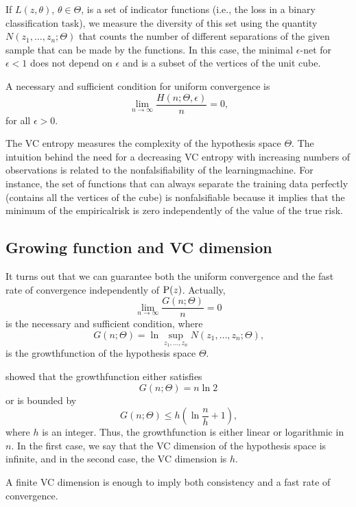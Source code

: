 If $L(z, \theta)$, $\theta \in \Theta$, is a set of indicator functions (i.e., the \gls{loss} in a binary
classification task),  we measure the diversity of this set using the quantity $N(z_1,
\dots, z_n; \Theta)$ that counts the number of different separations of the given sample
that can be made by the functions.  In this case, the minimal $\epsilon$-net for $\epsilon < 1$
does not depend on $\epsilon$ and is a subset of the vertices of the unit cube.

A necessary and sufficient condition for uniform convergence is
\begin{equation}
  \label{eq:uniform-convergence}
  \lim_{n \to \infty} \frac{H(n; \Theta, \epsilon)}{n} = 0\text{,}
\end{equation}
for all $\epsilon > 0$.

The VC entropy measures the complexity of the hypothesis space $\Theta$.  The intuition
behind the need for a decreasing VC entropy with increasing numbers of observations is
related to the nonfalsifiability of the \gls{learningmachine}.  For instance, the set of
functions that can always separate the training data perfectly (contains all the vertices
of the cube) is nonfalsifiable because
it implies that the minimum of the \gls{empiricalrisk} is zero independently of the value of
the true risk.

\subsection{Growing function and VC dimension}
\label{sub:vc-dimension}

It turns out that we can guarantee both the uniform convergence and the fast rate of
convergence independently of $\operatorname{P}(z)$.  Actually,
\[
  \lim_{n \to \infty} \frac{G(n; \Theta)}{n} = 0
\]
is the necessary and sufficient condition, where
\[
  G(n; \Theta) = \ln \sup_{z_1, \dots, z_n} N(z_1, \dots, z_n; \Theta)\text{,}
\]
is the \gls{growthfunction} of the hypothesis space $\Theta$.

\textcite{Vapnik1968} showed that the \gls{growthfunction} either
satisfies
\[
  G(n; \Theta) = n \ln 2
\]
or is bounded by
\[
  G(n; \Theta) \leq h \left( \ln \frac{n}{h} + 1 \right)\text{,}
\]
where $h$ is an integer.  Thus, the \gls{growthfunction} is either linear or logarithmic in
$n$.  In the first case, we say that the VC dimension of the hypothesis space is
infinite, and in the second case, the VC dimension is $h$.

A finite VC dimension is enough to imply both consistency and a fast rate of convergence.

